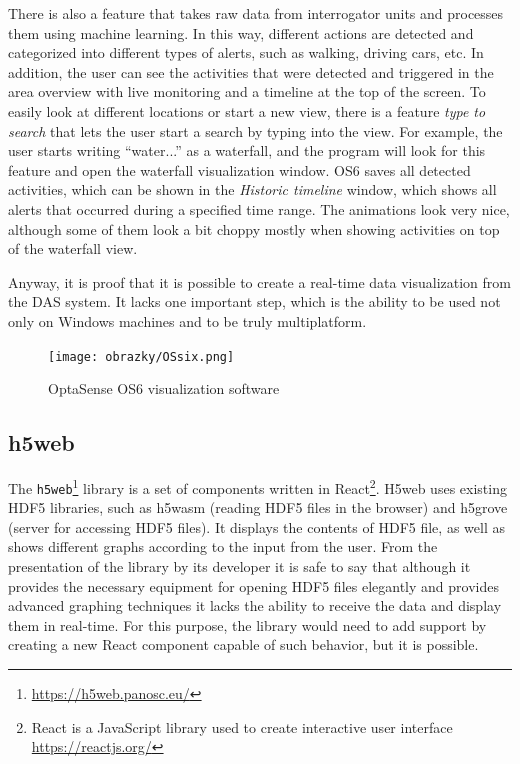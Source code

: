 There is also a feature that takes raw data from interrogator units and processes them using machine learning. In this way, different actions are detected and categorized into different types of alerts, such as walking, driving cars, etc. In addition, the user can see the activities that were detected and triggered in the area overview with live monitoring and a timeline at the top of the screen. To easily look at different locations or start a new view, there is a feature \textit{type to search} that lets the user start a search by typing into the view. For example, the user starts writing ``water...'' as a waterfall, and the program will look for this feature and open the waterfall visualization window. OS6 saves all detected activities, which can be shown in the \textit{Historic timeline} window, which shows all alerts that occurred during a specified time range. The animations look very nice, although some of them look a bit choppy mostly when showing activities on top of the waterfall view. 

Anyway, it is proof that it is possible to create a real-time data visualization from the DAS system. It lacks one important step, which is the ability to be used not only on Windows machines and to be truly multiplatform.

\begin{figure}[]
    \centering
    \texttt{[image: obrazky/OSsix.png]}
    \caption{OptaSense OS6 visualization software \cite{ytossix}}
    \label{fig:ossix}
\end{figure}

\subsection{h5web}

The \verb|h5web|\footnote{\url{https://h5web.panosc.eu/}} library is a set of components written in React\footnote{React is a JavaScript library used to create interactive user interface \url{https://reactjs.org/}}. H5web uses existing HDF5 libraries, such as h5wasm (reading HDF5 files in the browser) and h5grove (server for accessing HDF5 files). It displays the contents of HDF5 file, as well as shows different graphs according to the input from the user. From the presentation of the library by its developer it is safe to say that although it provides the necessary equipment for opening HDF5 files elegantly and provides advanced graphing techniques it lacks the ability to receive the data and display them in real-time. For this purpose, the library would need to add support by creating a new React component capable of such behavior, but it is possible.

